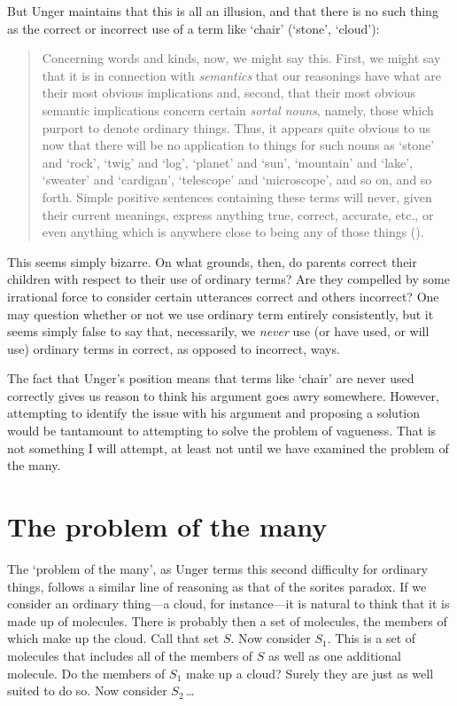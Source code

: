 \documentclass[11pt]{article}
\newenvironment{squote}{%
	\begin{quote}\begin{singlespace}%
	}{%
	\end{singlespace}\end{quote}}
\begin{document}
\begin{spacing}{1.5}
But Unger maintains that this is all an illusion, and that there is no
such thing as the correct or incorrect use of a term like `chair'
(`stone', `cloud'):

\begin{squote}
Concerning words and kinds, now, we might say this.  First, we might
say that it is in connection with \emph{semantics} that our reasonings have
what are their most obvious implications and, second, that their most
obvious semantic implications concern certain \emph{sortal nouns}, namely,
those which purport to denote ordinary things.  Thus, it appears quite
obvious to us now that there will be no application to things for such
nouns as `stone' and `rock', `twig' and `log', `planet' and `sun',
`mountain' and `lake', `sweater' and `cardigan', `telescope' and
`microscope', and so on, and so forth.  Simple positive sentences
containing these terms will never, given their current meanings,
express anything true, correct, accurate, etc., or even anything which
is anywhere close to being any of those things
(\citeyear[148]{unger1979}).
\end{squote}

This seems simply bizarre.  On what grounds, then, do parents correct
their children with respect to their use of ordinary terms?  Are they
compelled by some irrational force to consider certain utterances
correct and others incorrect?  One may question whether or not we use
ordinary term entirely consistently, but it seems simply false to say that,
necessarily, we {\em never} use (or have used, or will use) ordinary
terms in correct, as opposed to incorrect, ways.  

The fact that Unger's position means that terms like `chair' are never
used correctly gives us reason to think his argument goes awry
somewhere.  However, attempting to identify the issue with his
argument and proposing a solution would be tantamount to attempting to
solve the problem of vagueness.  That is not something I will attempt,
at least not until we have examined the problem of the many.

\section{The problem of the many}
\label{many}
The `problem of the many', as Unger terms this second difficulty for
ordinary things, follows a similar line of reasoning as that of the
sorites paradox.  If we consider an ordinary thing---a cloud, for
instance---it is natural to think that it is made up of molecules.
There is probably then a set of molecules, the members of which make
up the cloud.  Call that set $S$.  Now consider $S_1$.  This is a set
of molecules that includes all of the members of $S$ as well as one
additional molecule.  Do the members of $S_1$ make up a cloud?  Surely
they are just as well suited to do so.  Now consider $S_2$\,\ldots


\end{spacing}
\end{document}

